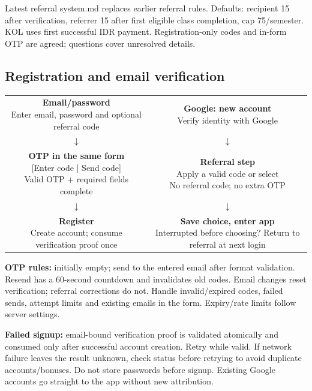 \documentclass[11pt,a4paper]{article}
\newcommand{\flowbox}[2]{\fbox{\parbox[c]{#1}{\centering\small #2}}}
\begin{document}
Latest referral system.md replaces earlier referral rules. Defaults: recipient 15 after verification, referrer 15 after first eligible class completion, cap 75/\allowbreak{}semester. KOL uses first successful IDR payment. Registration-only codes and in-form OTP are agreed; questions cover unresolved details.

\subsection*{Registration and email verification}

\begin{center}
\begin{tabular}{@{}c@{\hspace{5mm}}c@{}}
\flowbox{70mm}{\textbf{Email/password}\\Enter email, password and optional referral code} & \flowbox{70mm}{\textbf{Google: new account}\\Verify identity with Google} \\
$\downarrow$ & $\downarrow$ \\
\flowbox{70mm}{\textbf{OTP in the same form}\\{}[Enter code | Send code]\\Valid OTP + required fields complete} & \flowbox{70mm}{\textbf{Referral step}\\Apply a valid code or select\\No referral code; no extra OTP} \\
$\downarrow$ & $\downarrow$ \\
\flowbox{70mm}{\textbf{Register}\\Create account; consume verification proof once} & \flowbox{70mm}{\textbf{Save choice, enter app}\\Interrupted before choosing? Return to referral at next login} \\
\end{tabular}
\end{center}

\textbf{OTP rules:} initially empty; send to the entered email after format validation. Resend has a 60-second countdown and invalidates old codes. Email changes reset verification; referral corrections do not. Handle invalid/\allowbreak{}expired codes, failed sends, attempt limits and existing emails in the form. Expiry/\allowbreak{}rate limits follow server settings.

\textbf{Failed signup:} email-bound verification proof is validated atomically and consumed only after successful account creation. Retry while valid. If network failure leaves the result unknown, check status before retrying to avoid duplicate accounts/\allowbreak{}bonuses. Do not store passwords before signup. Existing Google accounts go straight to the app without new attribution.
\end{document}
